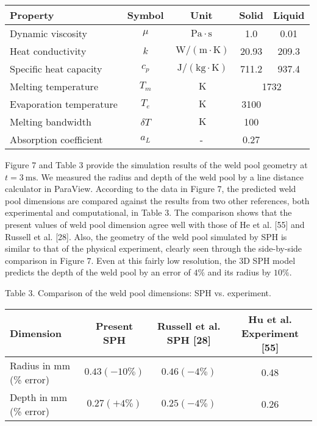 \documentclass[10pt]{article}
\begin{document}
\begin{center}
\begin{tabular}{lcccc}
\hline
Property & Symbol & Unit & Solid & Liquid \\
\hline
Dynamic viscosity & $\mu$ & $\mathrm{Pa} \cdot \mathrm{s}$ & 1.0 & 0.01 \\
Heat conductivity & $k$ & $\mathrm{~W} /(\mathrm{m} \cdot \mathrm{K})$ & 20.93 & 209.3 \\
Specific heat capacity & $c_{p}$ & $\mathrm{~J} /(\mathrm{kg} \cdot \mathrm{K})$ & 711.2 & 937.4 \\
\hline
Melting temperature & $T_{m}$ & $\mathrm{~K}$ & \multicolumn{2}{c}{1732} \\
Evaporation temperature & $T_{e}$ & $\mathrm{~K}$ & 3100 &  \\
Melting bandwidth & $\delta T$ & $\mathrm{~K}$ & 100 &  \\
Absorption coefficient & $a_{L}$ & - & 0.27 &  \\
\hline
\end{tabular}
\end{center}

Figure 7 and Table 3 provide the simulation results of the weld pool geometry at $t=3 \mathrm{~ms}$. We measured the radius and depth of the weld pool by a line distance calculator in ParaView. According to the data in Figure 7, the predicted weld pool dimensions are compared against the results from two other references, both experimental and computational, in Table 3. The comparison shows that the present values of weld pool dimension agree well with those of He et al. [55] and Russell et al. [28]. Also, the geometry of the weld pool simulated by SPH is similar to that of the physical experiment, clearly seen through the side-by-side comparison in Figure 7. Even at this fairly low resolution, the 3D SPH model predicts the depth of the weld pool by an error of $4 \%$ and its radius by $10 \%$.

Table 3. Comparison of the weld pool dimensions: SPH vs. experiment.

\begin{center}
\begin{tabular}{lccc}
\hline
Dimension & Present SPH & Russell et al. SPH [28] & Hu et al. Experiment [55] \\
\hline
Radius in mm (\% error) & $0.43(-10 \%)$ & $0.46(-4 \%)$ & 0.48 \\
Depth in mm (\% error) & $0.27(+4 \%)$ & $0.25(-4 \%)$ & 0.26 \\
\hline
\end{tabular}
\end{center}
\end{document}
